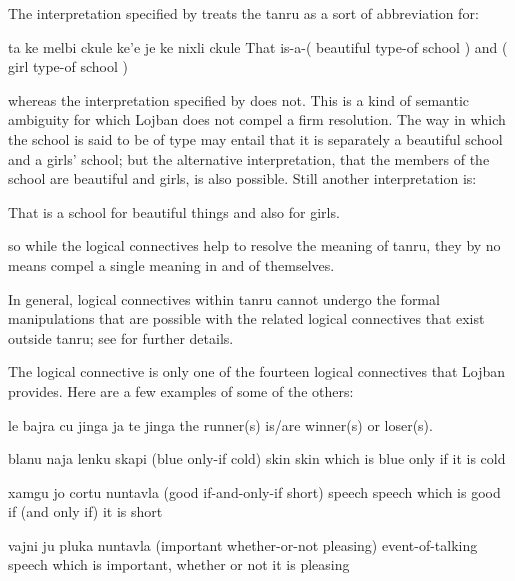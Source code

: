 The interpretation specified by 
    treats the tanru as a sort of abbreviation for:
\begin{example}
ta ke melbi ckule ke'e\n
\T	je ke nixli ckule \n
That is-a-( beautiful type-of school )\n
\T	and ( girl type-of school )
\end{example}

{\noindent}whereas the interpretation specified by  does not. This is a kind of
    semantic ambiguity for which Lojban does not compel a firm
    resolution. The way in which the school is said to be of type
     may entail that it is separately a
    beautiful school and a girls' school; but the alternative
    interpretation, that the members of the school are beautiful
    and girls, is also possible. Still another interpretation is:
\begin{example}
That is a school for beautiful things\n
\T	and also for girls.
\end{example}

{\noindent}so while the logical connectives help to resolve the meaning of
    tanru, they by no means compel a single meaning in and of
    themselves. 

In general, logical connectives within tanru cannot undergo
    the formal manipulations that are possible with the related
    logical connectives that exist outside tanru; see  for further details.

The logical connective  is only one of the fourteen
    logical connectives that Lojban provides. Here are a few
    examples of some of the others:
\begin{example}
le bajra cu jinga ja te jinga\n
the runner(s) is/are winner(s) or loser(s).
\end{example}

\begin{example}
blanu naja lenku skapi\n
(blue only-if cold) skin\n
skin which is blue only if it is cold
\end{example}

\begin{example}
xamgu jo cortu nuntavla\n
(good if-and-only-if short) speech\n
speech which is good if (and only if) it is short
\end{example}

\begin{example}
vajni ju pluka nuntavla\n
(important whether-or-not pleasing) event-of-talking\n
speech which is important, whether or not it is pleasing
\end{example}

